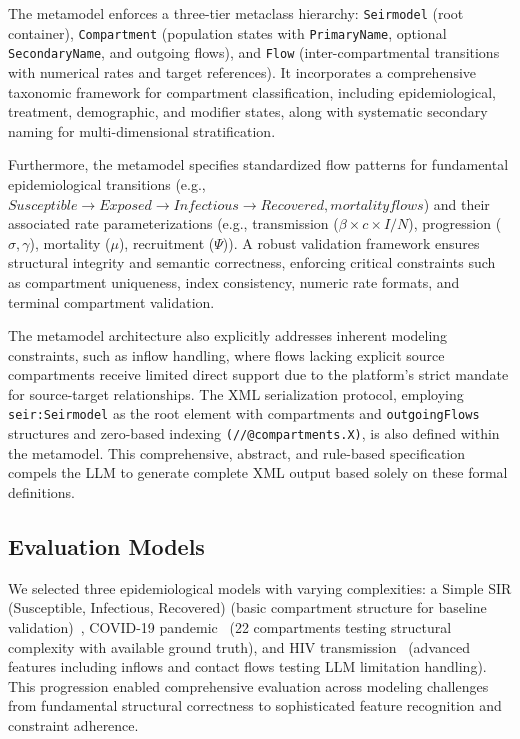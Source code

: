 \documentclass[conference]{IEEEtran}
\begin{document}
The metamodel enforces a three-tier metaclass hierarchy: \texttt{Seirmodel} (root container), \texttt{Compartment} (population states with \texttt{PrimaryName}, optional \texttt{SecondaryName}, and outgoing flows), and \texttt{Flow} (inter-compartmental transitions with numerical rates and target references). It incorporates a comprehensive taxonomic framework for compartment classification, including epidemiological, treatment, demographic, and modifier states, along with systematic secondary naming for multi-dimensional stratification.

Furthermore, the metamodel specifies standardized flow patterns for fundamental epidemiological transitions (e.g., $Susceptible \rightarrow Exposed \rightarrow Infectious \rightarrow Recovered, mortality flows$) and their associated rate parameterizations (e.g., transmission ($\beta \times c \times I/N$), progression ($\sigma,\gamma$), mortality ($\mu$), recruitment ($\Psi$)). A robust validation framework ensures structural integrity and semantic correctness, enforcing critical constraints such as compartment uniqueness, index consistency, numeric rate formats, and terminal compartment validation.

The metamodel architecture also explicitly addresses inherent modeling constraints, such as inflow handling, where flows lacking explicit source compartments receive limited direct support due to the platform's strict mandate for source-target relationships. The XML serialization protocol, employing \texttt{seir:Seirmodel} as the root element with compartments and \texttt{outgoingFlows} structures and zero-based indexing \texttt{(//@compartments.X)}, is also defined within the metamodel. This comprehensive, abstract, and rule-based specification compels the LLM to generate complete XML output based solely on these formal definitions.

\subsection{Evaluation Models}
We selected three epidemiological models with varying complexities: a Simple SIR (Susceptible, Infectious, Recovered) (basic compartment structure for baseline validation)~\cite{b19}, COVID-19 pandemic~\cite{b4} (22 compartments testing structural complexity with available ground truth), and HIV transmission~\cite{b18} (advanced features including inflows and contact flows testing LLM limitation handling). This progression enabled comprehensive evaluation across modeling challenges from fundamental structural correctness to sophisticated feature recognition and constraint adherence.
\end{document}
